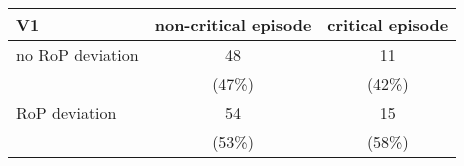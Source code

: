 \begin{table}[ht]
\centering
\begin{tabular}{l|cc}
  \hline
V1 & non-critical episode & critical episode \\ 
  \hline
no RoP deviation & 48 & 11 \\ 
   & (47\%) & (42\%) \\ 
  RoP deviation & 54 & 15 \\ 
   & (53\%) & (58\%) \\ 
   \hline
\end{tabular}
\end{table}
